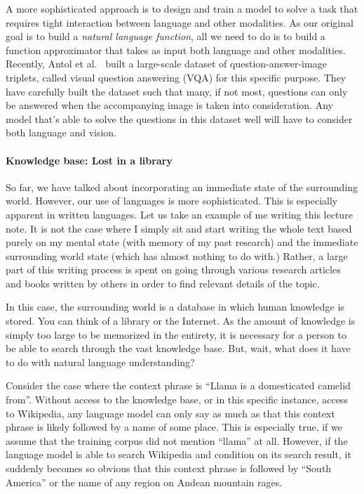 \documentclass{report}
\begin{document}
A more sophisticated approach is to design and train a model to solve a task
that requires tight interaction between language and other modalities. As our
original goal is to build a {\em natural language function}, all we need to do
is to build a function approximator that takes as input both language and other
modalities. Recently, Antol et al.~\cite{VQA} built a large-scale dataset of
question-answer-image triplets, called visual question answering (VQA) for this
specific purpose. They have carefully built the dataset such that many, if not
most, questions can only be answered when the accompanying image is taken into
consideration. Any model that's able to solve the questions in this dataset well
will have to consider both language and vision.

\paragraph{Knowledge base: Lost in a library} 

So far, we have talked about incorporating an immediate state of the surrounding
world. However, our use of languages is more sophisticated. This is especially
apparent in written languages. Let us take an example of me writing this lecture
note. It is not the case where I simply sit and start writing the whole text
based purely on my mental state (with memory of my past research) and the
immediate surrounding world state (which has almost nothing to do with.) Rather,
a large part of this writing process is spent on going through various research
articles and books written by others in order to find relevant details of the
topic. 

In this case, the surrounding world is a database in which human knowledge is
stored. You can think of a library or the Internet. As the amount of knowledge
is simply too large to be memorized in the entirety, it is necessary for a
person to be able to search through the vast knowledge base. But, wait, what
does it have to do with natural language understanding?

Consider the case where the context phrase is ``Llama is a domesticated camelid
from''. Without access to the knowledge base, or in this specific instance,
access to Wikipedia, any language model can only say as much as that this
context phrase is likely followed by a name of some place. This is especially
true, if we assume that the training corpus did not mention ``llama'' at all.
However, if the language model is able to search Wikipedia and condition on its
search result, it suddenly becomes so obvious that this context phrase is
followed by ``South America'' or the name of any region on Andean mountain
rages. 
\end{document}
